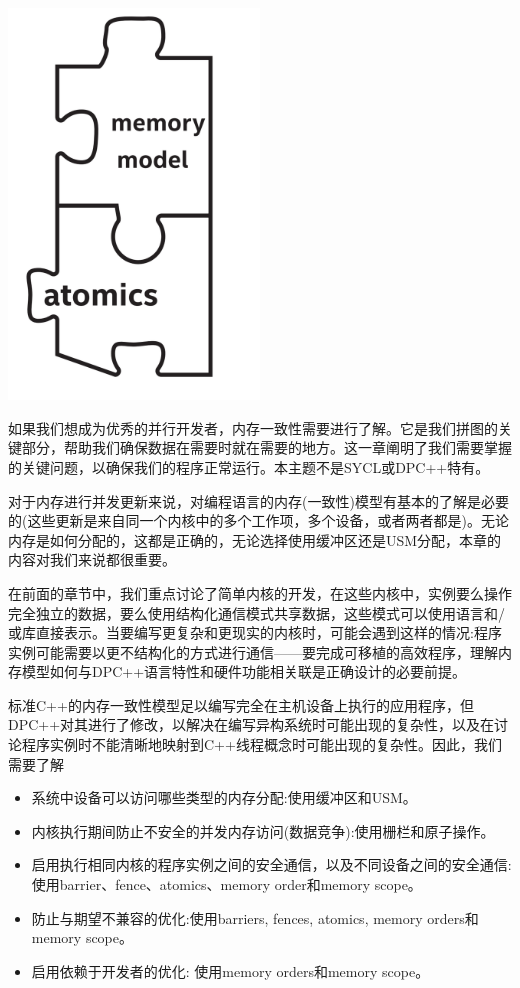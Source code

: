 \begin{center}
	\includegraphics[width=0.5\textwidth]{content/chapter-19/images/1}
\end{center}

如果我们想成为优秀的并行开发者，内存一致性需要进行了解。它是我们拼图的关键部分，帮助我们确保数据在需要时就在需要的地方。这一章阐明了我们需要掌握的关键问题，以确保我们的程序正常运行。本主题不是SYCL或DPC++特有。\par

对于内存进行并发更新来说，对编程语言的内存(一致性)模型有基本的了解是必要的(这些更新是来自同一个内核中的多个工作项，多个设备，或者两者都是)。无论内存是如何分配的，这都是正确的，无论选择使用缓冲区还是USM分配，本章的内容对我们来说都很重要。\par

在前面的章节中，我们重点讨论了简单内核的开发，在这些内核中，实例要么操作完全独立的数据，要么使用结构化通信模式共享数据，这些模式可以使用语言和/或库直接表示。当要编写更复杂和更现实的内核时，可能会遇到这样的情况:程序实例可能需要以更不结构化的方式进行通信——要完成可移植的高效程序，理解内存模型如何与DPC++语言特性和硬件功能相关联是正确设计的必要前提。\par

标准C++的内存一致性模型足以编写完全在主机设备上执行的应用程序，但DPC++对其进行了修改，以解决在编写异构系统时可能出现的复杂性，以及在讨论程序实例时不能清晰地映射到C++线程概念时可能出现的复杂性。因此，我们需要了解\par

\begin{itemize}
	\item 系统中设备可以访问哪些类型的内存分配:使用缓冲区和USM。
	\item 内核执行期间防止不安全的并发内存访问(数据竞争):使用栅栏和原子操作。
	\item 启用执行相同内核的程序实例之间的安全通信，以及不同设备之间的安全通信:使用barrier、fence、atomics、memory order和memory scope。
	\item 防止与期望不兼容的优化:使用barriers, fences, atomics, memory orders和memory scope。
	\item 启用依赖于开发者的优化: 使用memory orders和memory scope。
\end{itemize}

